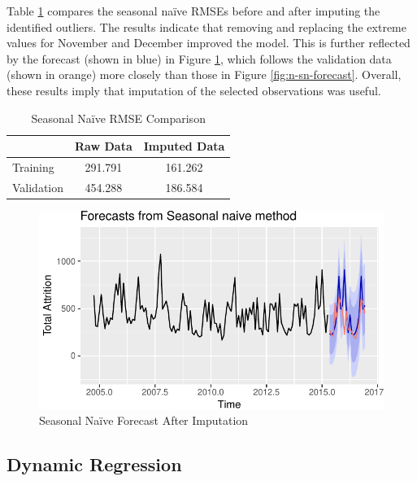 \documentclass[12pt,letterpaper,toc=flat,oneside]{report}
\theoremstyle{definition}
\theoremstyle{definition}
\theoremstyle{definition}
\theoremstyle{remark}
\begin{document}
Table \ref{tab:season-rmse-compare} compares the seasonal naïve RMSEs
before and after imputing the identified outliers. The results indicate
that removing and replacing the extreme values for November and December
improved the model. This is further reflected by the forecast (shown in
blue) in Figure \ref{fig:sn-forecast-2}, which follows the validation
data (shown in orange) more closely than those in Figure
\ref{fig:n-sn-forecast}. Overall, these results imply that imputation of
the selected observations was useful.

\begin{table}[!h]

\caption{\label{tab:season-rmse-compare}Seasonal Na\"ive RMSE Comparison}
\centering
\begin{tabular}[t]{lcc}
\toprule
\bfseries{ } & \bfseries{Raw Data} & \bfseries{Imputed Data}\\
\midrule
Training & 291.791 & 161.262\\
Validation & 454.288 & 186.584\\
\bottomrule
\end{tabular}
\end{table}

\begin{figure}[H]

{\centering \includegraphics{elliott-econometric-personnel-retention-18_files/figure-latex/sn-forecast-2-1} 

}

\caption{Seasonal Na\"ive Forecast After Imputation}\label{fig:sn-forecast-2}
\end{figure}

\hypertarget{dynamic-regression}{%
\subsection{Dynamic Regression}\label{dynamic-regression}}
\end{document}
